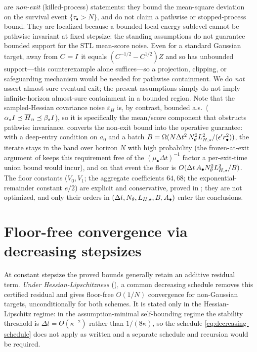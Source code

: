 \begin{remark}
\label{rem:stoch-local-scope}
 are \emph{non-exit} (killed-process) statements: they
bound the mean-square deviation on the survival event $\{\tau_\bullet>N\}$, and do not claim a
pathwise or stopped-process bound. They are localized because a bounded local energy sublevel cannot
be pathwise invariant at fixed stepsize: the standing assumptions do not guarantee bounded support for
the STL mean-score noise. Even for a standard Gaussian target, away from $C=I$ it equals
$(C^{-1/2}-C^{1/2})Z$ and so has unbounded support---this counterexample alone suffices---so a
projection, clipping, or safeguarding mechanism would be needed for pathwise containment. We do \emph{not} assert almost-sure eventual exit; the present assumptions simply do not
imply infinite-horizon almost-sure containment in a bounded region. Note that the sampled-Hessian
covariance noise $\varepsilon_H$ is, by contrast, bounded a.s.\ ($\alpha_\star I\preceq\overline H_n\preceq\beta_\star I$),
so it is specifically the mean/score component that obstructs pathwise invariance.
 converts the non-exit bound into the operative guarantee: with a deep-entry
condition on $a_0$ and a batch $B=\Omega(N\Delta t^2\,N_\theta^2L_{H,\star}^2/(\epsilon'r_\bullet^2))$, the
iterate stays in the band over horizon $N$ with high probability (the frozen-at-exit argument of
 keeps this requirement free of the $(\mu_\bullet\Delta t)^{-1}$ factor a
per-exit-time union bound would incur), and on that event the floor is
$O(\Delta t\,A_\bullet N_\theta^2L_{H,\star}^2/B)$. The floor
constants ($V_0,V_1$; the aggregate coefficients $64,68$; the exponential-remainder constant $e/2$)
are explicit and conservative, proved in ;
they are not optimized, and only their orders in $(\Delta t,N_\theta,L_{H,\star},B,A_\bullet)$ enter the
conclusions.
\end{remark}

\section{Floor-free convergence via decreasing stepsizes}
\label{sec:decreasing}

At constant stepsize the proved bounds generally retain an additive residual term.
\emph{Under Hessian-Lipschitzness} (), a common decreasing schedule removes
this certified residual and gives floor-free
$O(1/N)$ convergence for non-Gaussian targets, unconditionally for both schemes. It is stated only in
the Hessian-Lipschitz regime: in the assumption-minimal self-bounding regime the stability threshold
is $\Delta t=\Theta(\kappa^{-2})$ rather than $1/(8\kappa)$, so the schedule
\eqref{eq:decreasing-schedule} does not apply as written and a separate schedule and recursion would
be required.

